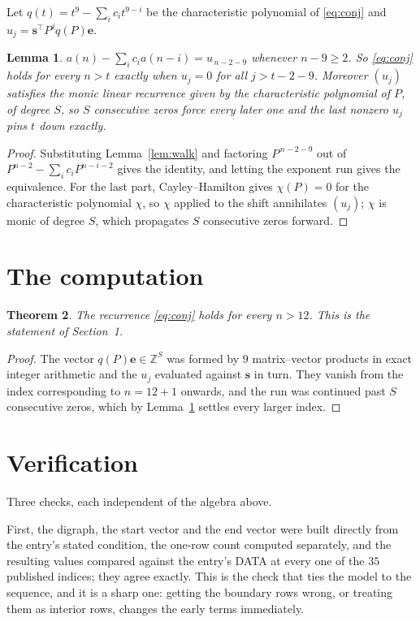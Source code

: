 \documentclass[11pt,a4paper]{article}
\theoremstyle{plain}
\newtheorem{theorem}{Theorem}
\newtheorem{lemma}[theorem]{Lemma}
\theoremstyle{definition}
\begin{document}
Let $q(t)=t^{9}-\sum_i c_i t^{9-i}$ be the characteristic polynomial of
\eqref{eq:conj} and $u_j=\mathbf{s}^{\!\top}P^{j}q(P)\mathbf{e}$.

\begin{lemma}\label{lem:crit}
$a(n)-\sum_i c_i a(n-i)=u_{\,n-2-9}$ whenever $n-9\ge2$. So \eqref{eq:conj}
holds for every $n>t$ exactly when $u_j=0$ for all $j>t-2-9$. Moreover $(u_j)$
satisfies the monic linear recurrence given by the characteristic polynomial of $P$, of
degree $S$, so $S$ consecutive zeros force every later one and the last nonzero $u_j$ pins
$t$ down exactly.
\end{lemma}

\begin{proof}
Substituting Lemma~\ref{lem:walk} and factoring $P^{\,n-2-9}$ out of
$P^{n-2}-\sum_i c_i P^{n-i-2}$ gives the identity, and letting the exponent run gives the
equivalence. For the last part, Cayley--Hamilton gives $\chi(P)=0$ for the characteristic
polynomial $\chi$, so $\chi$ applied to the shift annihilates $(u_j)$; $\chi$ is monic of
degree $S$, which propagates $S$ consecutive zeros forward.
\end{proof}

\section{The computation}

\begin{theorem}
The recurrence \eqref{eq:conj} holds for every $n>12$. This is the statement of
Section~1.
\end{theorem}

\begin{proof}
The vector $q(P)\mathbf{e}\in\mathbb{Z}^{S}$ was formed by $9$ matrix--vector
products in exact integer arithmetic and the $u_j$ evaluated against $\mathbf{s}$ in turn.
They vanish from the index corresponding to $n=12+1$ onwards, and the run was continued
past $S$ consecutive zeros, which by Lemma~\ref{lem:crit} settles every larger index.
\end{proof}

\section{Verification}

Three checks, each independent of the algebra above.

First, the digraph, the start vector and the end vector were built directly from the
entry's stated condition, the one-row count computed separately, and the resulting values
compared against the entry's DATA at every one of the $35$ published indices; they
agree exactly. This is the check that ties the model to the sequence, and it is a sharp one:
getting the boundary rows wrong, or treating them as interior rows, changes the early terms
immediately.
\end{document}
